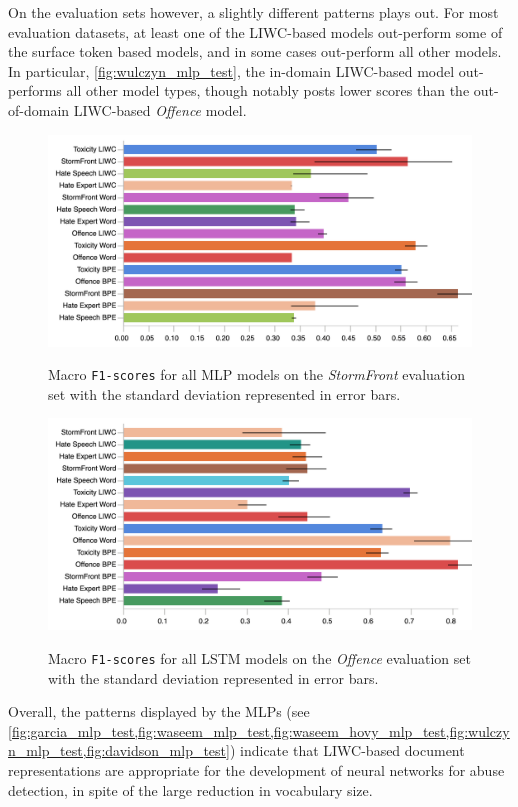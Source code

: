 On the evaluation sets however, a slightly different patterns plays out. 
For most evaluation datasets, at least one of the LIWC-based models out-perform some of the surface token based models, and in some cases out-perform all other models.
In particular, \cref{fig:wulczyn_mlp_test}, the in-domain LIWC-based model out-performs all other model types, though notably posts lower scores than the out-of-domain LIWC-based \textit{Offence} model.

\begin{figure}
\begin{minipage}{\textwidth}
\centering
  \includegraphics[width=\textwidth]{all_mlp_garcia_test.pdf}
  \caption{Macro \texttt{F1-scores} for all MLP models on the \textit{StormFront} evaluation set with the standard deviation represented in error bars.}
  \label{fig:garcia_mlp_test}
  \vfill
    \includegraphics[width=\textwidth]{all_lstm_davidson_test.pdf}
    \caption{Macro \texttt{F1-scores} for all LSTM models on the \textit{Offence} evaluation set with the standard deviation represented in error bars.}
    \label{fig:davidson_lstm_test}
  \end{minipage}
\end{figure}

Overall, the patterns displayed by the MLPs (see \cref{fig:garcia_mlp_test,fig:waseem_mlp_test,fig:waseem_hovy_mlp_test,fig:wulczyn_mlp_test,fig:davidson_mlp_test}) indicate that LIWC-based document representations are appropriate for the development of neural networks for abuse detection, in spite of the large reduction in vocabulary size.

